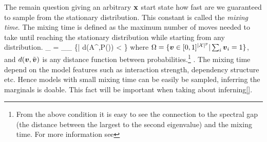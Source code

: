 The remain question giving an arbitrary ${\bf x}$ start state how fast are we guaranteed to sample from the stationary distribution.
This constant is called the \textit{mixing time}.
The mixing time is defined as the maximum number of moves needed to take until reaching the stationary distribution while starting from any distribution.
\be
\tau_{\epsilon}  = \min_{\tau \in \naturalNumbers}\sup_{\vv \in \Omega} \left\{\tau | d\left(A^{\tau}\vv,P(\xx)\right) < \epsilon\right\}
\ee
where $\Omega = \{ \boldsymbol{v} \in [0,1]^{|{\cal X}|^{p}} | \sum_i \boldsymbol{v}_i = 1\}$, and $d(\boldsymbol{v},\tilde{\boldsymbol{v}})$ is any distance function between probabilities.\footnote{ From the above condition it is easy to see the connection to the spectral gap (the distance between the largest to the second eigenvalue) and the mixing time. For more information see\cite{levin2009markov}}  .
The mixing time depend on the model features such as interaction strength,  dependency structure etc.
Hence models with small mixing time can be easily be sampled, inferring the marginals is doable.
This fact will be important when taking about inferning\ref{}.    

